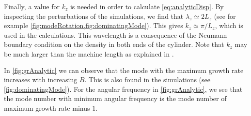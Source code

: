 Finally, a value for $k_z$ is needed in order to calculate \cref{eq:analyticDisp}.
By inspecting the perturbations of the simulations, we find that $\lambda_z \simeq 2L_z$ (see for example \cref{fig:modeRotation,fig:dominatingMode}).
This gives $k_z\simeq\pi/L_z$, which is used in the calculations.
This wavelength is a consequence of the Neumann boundary condition on the density in both ends of the cylinder.
Note that $k_z$ may be much larger than the machine length as explained in \cite{Chen1965}.

In \cref{fig:grAnalytic} we can observe that the mode with the maximum growth rate increases with increasing $B$.
This is also found in the simulations (see \cref{fig:dominatingMode}).
For the angular frequency in \cref{fig:grAnalytic}, we see that the mode number with minimum angular frequency is the mode number of maximum growth rate minus $1$.
%
